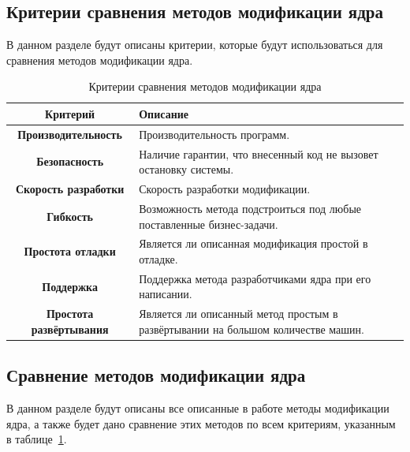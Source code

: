 \subsection{Критерии сравнения методов модификации ядра}\label{sec:----}
В данном разделе будут описаны критерии, которые будут использоваться для сравнения методов модификации ядра.

\begin{table}[ht]
    \begin{center}
        \begin{threeparttable}
            \captionsetup{justification=raggedright,singlelinecheck=off}
            \caption{\label{tab:criteria}Критерии сравнения методов модификации ядра}
            \begin{tabular}{|c|p{8cm}|}
                \hline
                \textbf{Критерий} & \textbf{Описание} \\ \hline
                \textbf{Производительность} & Производительность программ. \\ \hline
                \textbf{Безопасность} & Наличие гарантии, что внесенный код не вызовет остановку системы. \\ \hline
                \textbf{Скорость разработки} & Скорость разработки модификации. \\ \hline
                \textbf{Гибкость} & Возможность метода подстроиться под любые поставленные бизнес-задачи. \\ \hline
                \textbf{Простота отладки} & Является ли описанная модификация простой в отладке. \\ \hline
                \textbf{Поддержка} & Поддержка метода разработчиками ядра при его написании. \\ \hline
                \textbf{Простота развёртывания} & Является ли описанный метод простым в развёртывании на большом количестве машин. \\ \hline
            \end{tabular}
        \end{threeparttable}
    \end{center}
\end{table}
\newpage
\subsection{Сравнение методов модификации ядра}\label{sec:---}
В данном разделе будут описаны все описанные в работе методы модификации ядра, а также будет дано сравнение этих методов по всем критериям, указанным в таблице~\ref{tab:criteria}.

